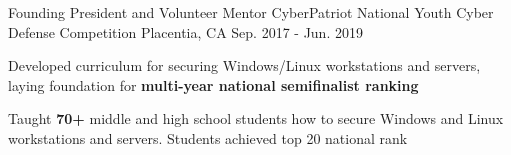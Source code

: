 \begin{cventries}
  \cventry
    {Founding President and Volunteer Mentor} %
    {CyberPatriot National Youth Cyber Defense Competition} %
    {Placentia, CA} %
    {Sep. 2017 - Jun. 2019} %
    {
      \begin{cvitems} %
        \item {Developed curriculum for securing Windows/Linux workstations and servers, laying foundation for \textbf{multi-year national semifinalist ranking}}
        \item {Taught \textbf{70+} middle and high school students how to secure Windows and Linux workstations and servers. Students achieved top 20 national rank}
      \end{cvitems}
    }

\end{cventries}
